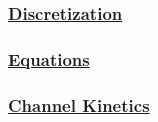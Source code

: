 \documentclass[12pt]{article}
\begin{document}
\subsubsection*{\href{../pub-purkinje-deschutter-discretization/pub-purkinje-deschutter-discretization.tex}{\bf Discretization}}

\subsubsection*{\href{../pub-purkinje-deschutter-equations/pub-purkinje-deschutter-equations.tex}{\bf Equations}}


\subsubsection*{\href{../pub-purkinje-deschutter-kinetics/pub-purkinje-deschutter-kinetics.tex}{\bf Channel Kinetics}}



\end{document}
